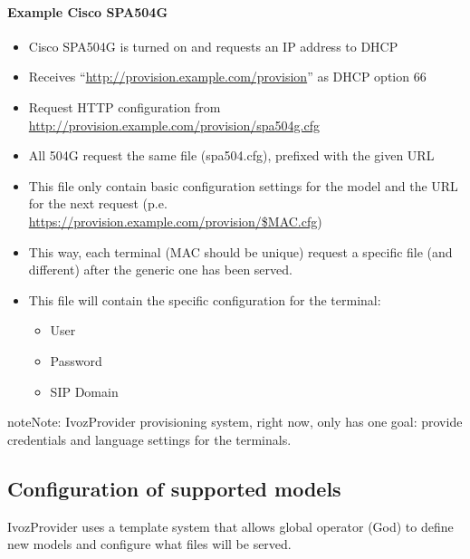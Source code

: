 \documentclass[letterpaper,10pt,english]{sphinxmanual}
\begin{document}
\paragraph{Example Cisco SPA504G}
\begin{itemize}
\item {} 
Cisco SPA504G is turned on and requests an IP address to DHCP

\item {} 
Receives “\url{http://provision.example.com/provision}” as DHCP option 66

\item {} 
Request HTTP configuration from \url{http://provision.example.com/provision/spa504g.cfg}

\item {} 
All 504G request the same file (spa504.cfg), prefixed with the given URL

\item {} 
This file only contain basic configuration settings for the model and the URL
for the next request (p.e. \url{https://provision.example.com/provision/\$MAC.cfg})

\item {} 
This way, each terminal (MAC should be unique) request a specific file
(and different) after the generic one has been served.

\item {} 
This file will contain the specific configuration for the terminal:
\begin{itemize}
\item {} 
User

\item {} 
Password

\item {} 
SIP Domain

\end{itemize}

\end{itemize}

\begin{notice}{note}{Note:}
IvozProvider provisioning system, right now, only has one goal:
provide credentials and language settings for the terminals.
\end{notice}


\subsection{Configuration of supported models}
\label{administration_portal/platform/terminal_manufacturers:configuration-of-supported-models}
IvozProvider uses a template system that allows global operator (God) to
define new models and configure what files will be served.
\end{document}
